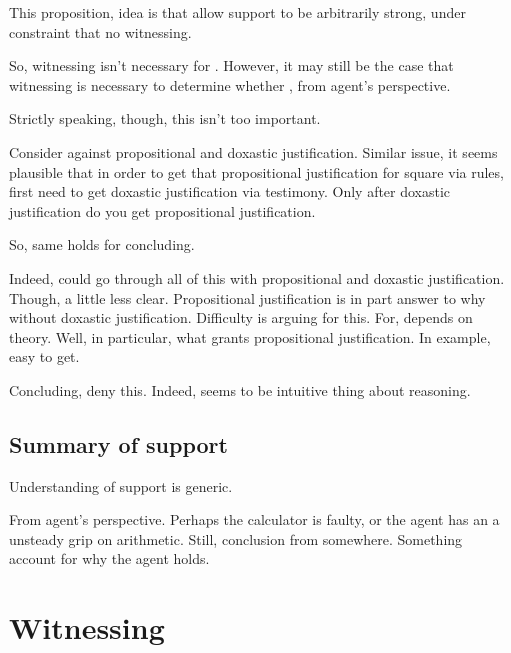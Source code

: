 \begin{note}
  This proposition, idea is that allow support to be arbitrarily strong, under constraint that no witnessing.

  So, witnessing isn't necessary for \support{}.
  However, it may still be the case that witnessing is necessary to determine whether \support{}, from agent's perspective.

  Strictly speaking, though, this isn't too important.

  Consider against propositional and doxastic justification.
  Similar issue, it seems plausible that in order to get that propositional justification for square via rules, first need to get doxastic justification via testimony.
  Only after doxastic justification do you get propositional justification.

  So, same holds for concluding.

  Indeed, could go through all of this with propositional and doxastic justification.
  Though, a little less clear.
  Propositional justification is in part answer to why without doxastic justification.
  Difficulty is arguing for this.
  For, depends on theory.
  Well, in particular, what grants propositional justification.
  In example, easy to get.

  Concluding, deny this.
  Indeed, seems to be intuitive thing about reasoning.
\end{note}

\subsection{Summary of support}
\label{sec:summary-support}

\begin{note}
  Understanding of support is generic.

  From agent's perspective.
  Perhaps the calculator is faulty, or the agent has an a unsteady grip on arithmetic.
  Still, conclusion from somewhere.
  Something account for why the agent holds.
\end{note}

\section{Witnessing}
\label{sec:reasoning}



